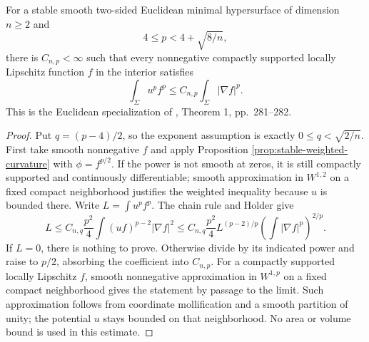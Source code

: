 \begin{theorem}\label{thm:ssy-integral-curvature}
For a stable smooth two-sided Euclidean minimal hypersurface of dimension $n\geq2$ and
\[
 4\leq p<4+\sqrt{8/n},
\]
there is $C_{n,p}<\infty$ such that every nonnegative compactly supported locally Lipschitz function $f$ in the interior satisfies
\[
 \int_\Sigma u^p f^p\leq C_{n,p}\int_\Sigma|\nabla f|^p.
\]
This is the Euclidean specialization of \cite{SSY75}, Theorem 1, pp.~281--282.
\end{theorem}
\begin{proof}
Put $q=(p-4)/2$, so the exponent assumption is exactly $0\leq q<\sqrt{2/n}$. First take smooth nonnegative $f$ and apply Proposition \ref{prop:stable-weighted-curvature} with $\phi=f^{p/2}$. If the power is not smooth at zeros, it is still compactly supported and continuously differentiable; smooth approximation in $W^{1,2}$ on a fixed compact neighborhood justifies the weighted inequality because $u$ is bounded there. Write $L=\int u^pf^p$. The chain rule and Holder give
\[
 L\leq C_{n,q}\frac{p^2}{4}\int(uf)^{p-2}|\nabla f|^2
 \leq C_{n,q}\frac{p^2}{4}L^{(p-2)/p}
             \left(\int|\nabla f|^p\right)^{2/p}.
\]
If $L=0$, there is nothing to prove. Otherwise divide by its indicated power and raise to $p/2$, absorbing the coefficient into $C_{n,p}$. For a compactly supported locally Lipschitz $f$, smooth nonnegative approximation in $W^{1,p}$ on a fixed compact neighborhood gives the statement by passage to the limit. Such approximation follows from coordinate mollification and a smooth partition of unity; the potential $u$ stays bounded on that neighborhood. No area or volume bound is used in this estimate.
\end{proof}

